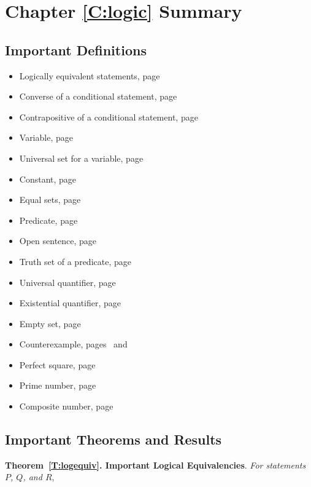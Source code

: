 \section{Chapter \ref{C:logic} Summary} \label{Su:logic}

\subsection*{Important Definitions}
\begin{multicols}{2}
\begin{itemize}
\item Logically equivalent statements, page~\pageref*{D:logequiv}
\item Converse of a conditional statement, page~\pageref*{D:converse}
\item Contrapositive of a conditional statement, page~\pageref*{D:contrapositive}
\item Variable, page~\pageref*{D:universal}
\item Universal set for a variable, page~\pageref*{D:universal}
\item Constant, page~\pageref*{D:universal}
\item Equal sets, page~\pageref*{D:setequality}
\item Predicate, page~\pageref*{D:predicate}
\item Open sentence, page~\pageref*{D:predicate}
\item Truth set of a predicate, page~\pageref*{D:truthset}
\item Universal quantifier, page~\pageref*{D:every}
\item Existential quantifier, page~\pageref*{D:every}
\item Empty set, page~\pageref*{sym:empty}
\item Counterexample, pages~\pageref*{D:counterexample} and~\pageref*{D:counterexample2}
\item Perfect square, page~\pageref*{D:square}
\item Prime number, page~\pageref*{D:prime}
\item Composite number, page~\pageref*{D:prime}
\end{itemize}
\end{multicols}
\hbreak


\subsection*{Important Theorems and Results}
\textbf{Theorem~\ref{T:logequiv}. Important Logical Equivalencies}.
\emph{For statements $P$, $Q$, and $R$},

